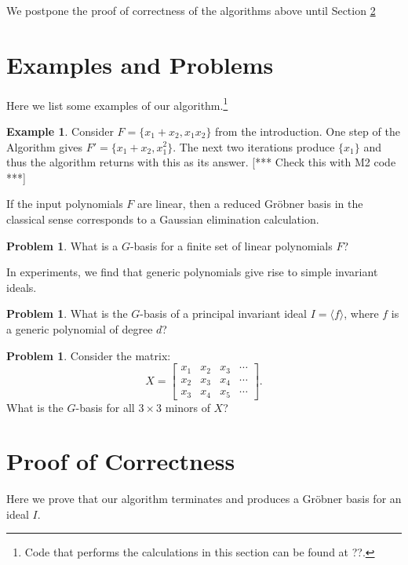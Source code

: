 \documentclass{amsart}
\theoremstyle{definition}
\newtheorem{example}[theorem]{Example}
\newtheorem{problem}[theorem]{Problem}
\theoremstyle{remark}
\numberwithin{equation}{section}
\newcommand{\<}{\langle}
\renewcommand{\>}{\rangle}
\begin{document}
We postpone the proof of correctness of the algorithms above until Section \ref{proofcorrect}

\section{Examples and Problems}\label{algexamples}

Here we list some examples of our algorithm.\footnote{Code that performs the calculations in this section can be found at ??.}

\begin{example}
Consider $F = \{x_1+x_2, x_1 x_2\}$ from the introduction.  One step of the Algorithm gives $F' = \{x_1+x_2, x_1^2\}$.
The next two iterations produce $\{x_1\}$ and thus the algorithm returns with this as its answer.  [*** Check this with M2 code ***]
\end{example}

If the input polynomials $F$ are linear, then a reduced Gr\"obner basis in the classical sense corresponds to a Gaussian elimination calculation.

\begin{problem}
What is a $G$-basis for a finite set of linear polynomials $F$?
\end{problem}

In experiments, we find that generic polynomials give rise to simple invariant ideals.

\begin{problem}
What is the $G$-basis of a principal invariant ideal $I = \langle f \rangle$, where $f$ is a generic polynomial of degree $d$?
\end{problem}

\begin{problem}
Consider the matrix:
\[ X =  \left[\begin{array}{cccc}x_1 & x_2 & x_3 & \cdots \\x_2 & x_3 & x_4 & \cdots \\x_3 & x_4 & x_5 & \cdots\end{array}\right].\]
What is the $G$-basis for all $3 \times 3$ minors of $X$?
\end{problem}



\section{Proof of Correctness}\label{proofcorrect}

Here we prove that our algorithm terminates and 
produces a Gr\"obner basis for an ideal $I$.
\end{document}
